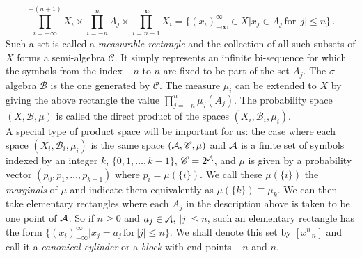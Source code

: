 \begin{equation} 
\label{eq:product_space}
    \prod_{i=-\infty}^{-(n+1)} X_i \times \prod_{i=-n}^{n} A_j \times \prod_{i=n+1}^{\infty} X_i = \big\{ (x_i)_{-\infty}^{\infty} \in X \big| x_j \in A_j \, \text{for} \, |j| \leq n \big\} \, .
\end{equation}
Such a set is called a \textit{measurable rectangle} and the collection of all such subsets of $X$ forms a semi-algebra $\mathscr{C}$. It simply represents an infinite bi-sequence for which the symbols from the index $-n$ to $n$ are fixed to be part of the set $A_j$. The $\sigma-$algebra $\mathscr{B}$ is the one generated by $\mathscr{C}$. The measure $\mu_i$ can be extended to $X$ by giving the above rectangle the value $\prod_{j=-n}^{n} \mu_j(A_j)$. The probability space $(X, \mathscr{B}, \mu)$ is called the direct product of the spaces $(X_i, \mathscr{B}_i, \mu_i)$. 
\\A special type of product space will be important for us: the case where each space $(X_i, \mathscr{B}_i, \mu_i)$ is the same space $(\mathcal{A}, \mathscr{C}, \mu)$ and $\mathcal{A}$ is a finite set of symbols indexed by an integer $k$, $\{ 0, 1, \dots, k-1 \}$, $\mathscr{C} = 2^{\mathcal{A}}$, and $\mu$ is given by a probability vector $(p_0,p_1, \dots, p_{k-1})$ where $p_i = \mu(\{i\})$. We call these $\mu(\{i\})$ the \textit{marginals} of $\mu$ and indicate them equivalently as  $\mu(\{k\}) \equiv \mu_k$. We can then take elementary rectangles where each $A_j$ in the description above is taken to be one point of $\mathcal{A}$. So if $n \geq 0$ and $a_j \in \mathcal{A}$, $|j| \leq n$, such an elementary rectangle has the form $\{ (x_i)_{-\infty}^{\infty} \big| x_j = a_j \, \text{for} \, |j| \leq n\}$. We shall denote this set by $[x_{-n}^n]$ and call it a \textit{canonical cylinder} or a \textit{block} with end points $-n$ and $n$. 

